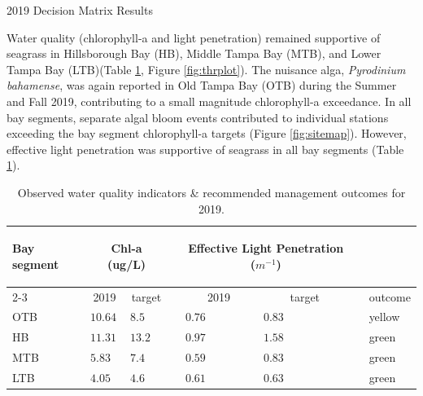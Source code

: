 \documentclass[final,t]{beamer}\usepackage[]{graphicx}\usepackage[]{color}
\begin{document}
\begin{frame}
\begin{columns}[t]
\begin{column}{.65\linewidth}
\begin{block}{2019 Decision Matrix Results}
\begin{minipage}{0.4\textwidth}
\footnotesize
Water quality (chlorophyll-a and light penetration) remained supportive of seagrass in Hillsborough Bay (HB), Middle Tampa Bay (MTB), and Lower Tampa Bay (LTB)(Table \ref{tab:segtab}, Figure \ref{fig:thrplot}). The nuisance alga, \textit{Pyrodinium bahamense}, was again reported in Old Tampa Bay (OTB) during the Summer and Fall 2019, contributing to a small magnitude chlorophyll-a exceedance. In all bay segments, separate algal bloom events contributed to individual stations exceeding the bay segment chlorophyll-a targets (Figure \ref{fig:sitemap}). However, effective light penetration was supportive of seagrass in all bay segments (Table \ref{tab:segtab}).
\end{minipage}
\hspace{0.01in}
\begin{minipage}{0.5\textwidth}
\footnotesize
\begin{table}[!tbp]
\caption{{\footnotesize Observed water quality indicators \& recommended management outcomes for 2019.}\label{tab:segtab}} 
\begin{center}
\begin{tabular}{lp{0.25in}p{0.25in}cp{0.25in}p{0.25in}cp{0.25in}}
\hline\hline
\multicolumn{1}{l}{\bfseries \parbox{0.5cm}{Bay segment}}&\multicolumn{2}{c}{\bfseries Chl-a (ug/L)}&\multicolumn{1}{c}{\bfseries }&\multicolumn{2}{c}{\bfseries \parbox{1.5cm}{Effective Light Penetration ($m^{-1}$)}}&\multicolumn{1}{c}{\bfseries }&\multicolumn{1}{c}{\bfseries }\tabularnewline
\cline{2-3} \cline{5-6}
\multicolumn{1}{l}{}&\multicolumn{1}{c}{2019}&\multicolumn{1}{c}{target}&\multicolumn{1}{c}{}&\multicolumn{1}{c}{2019}&\multicolumn{1}{c}{target}&\multicolumn{1}{c}{}&\multicolumn{1}{c}{\hspace{-0.3cm}\parbox{0.7cm}{outcome}}\tabularnewline
\hline
OTB&$10.64$&$ 8.5$&&$0.76$&$0.83$&&\cellcolor{yellow}yellow\tabularnewline
HB&$11.31$&$13.2$&&$0.97$&$1.58$&&\cellcolor{green}green\tabularnewline
MTB&$ 5.83$&$ 7.4$&&$0.59$&$0.83$&&\cellcolor{green}green\tabularnewline
LTB&$ 4.05$&$ 4.6$&&$0.61$&$0.63$&&\cellcolor{green}green\tabularnewline
\hline
\end{tabular}\end{center}
\end{table}


\end{minipage}
\end{block}
\end{column}
\end{columns}
\end{frame}
\end{document}
